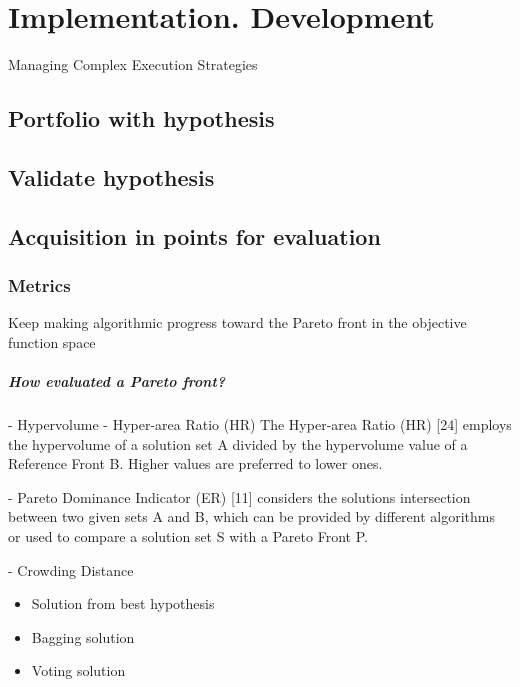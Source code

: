 \chapter{Implementation. Development}
Managing Complex Execution Strategies

\section{Portfolio with hypothesis}
\section{Validate hypothesis}
\section{Acquisition in points for evaluation}

    \subsection{Metrics}
        Keep making algorithmic progress toward the Pareto front in the objective function space
        \paragraph{How evaluated a Pareto front?}
            - Hypervolume
            - Hyper-area Ratio (HR)
            The Hyper-area Ratio (HR) [24] employs the hypervolume of a solution set A
            divided by the hypervolume value of a Reference Front B. Higher values are
            preferred to lower ones.

            - Pareto Dominance Indicator (ER) [11] considers the solutions intersection between two given sets A and B, which can be 
            provided by different algorithms or used to compare a solution set S with a Pareto Front P.

            - Crowding Distance

    \begin{itemize}
        \item Solution from best hypothesis
        \item Bagging solution
        \item Voting solution                
    \end{itemize}
